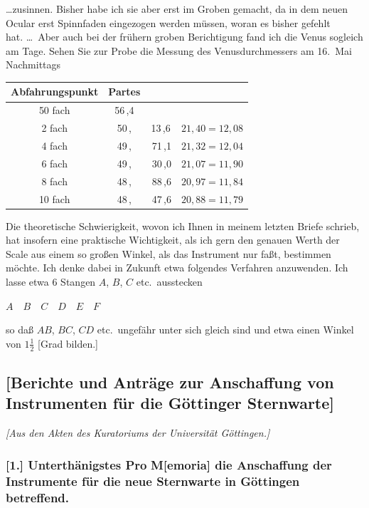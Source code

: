 \documentclass[12pt,a4paper]{article}
\theoremstyle{plain}
\theoremstyle{definition}
\theoremstyle{remark}
\begin{document}
\ldots zusinnen. Bisher habe ich sie aber erst im Groben gemacht, da in dem neuen Ocular erst Spinnfaden eingezogen werden müssen, woran es bisher gefehlt hat.\,\,\ldots\ Aber auch bei der frühern groben Berichtigung fand ich die Venus sogleich am Tage. Sehen Sie zur Probe die Messung des Venusdurchmessers am 16.\ Mai Nachmittags

\begin{center}
\small
\begin{tabular}{c|c|c|c}
Abfahrungspunkt & Partes & & \\
\hline
50 fach & 56\,,4 & & \\
2 fach & 50\,, & 13\,,6 & $21{,}40 = 12{,}08$ \\
4 fach & 49\,, & \,71\,,1 & $21{,}32 = 12{,}04$ \\
6 fach & 49\,, & \,30\,,0 & $21{,}07 = 11{,}90$ \\
8 fach & 48\,, & \,88\,,6 & $20{,}97 = 11{,}84$ \\
10 fach & 48\,, & \,47\,,6 & $20{,}88 = 11{,}79$
\end{tabular}
\end{center}

Die theoretische Schwierigkeit, wovon ich Ihnen in meinem letzten Briefe schrieb, hat insofern eine praktische Wichtigkeit, als ich gern den genauen Werth der Scale aus einem so großen Winkel, als das Instrument nur faßt, bestimmen möchte. Ich denke dabei in Zukunft etwa folgendes Verfahren anzuwenden. Ich lasse etwa 6 Stangen $A$, $B$, $C$ etc.\ ausstecken

\begin{center}
$A\quad B\quad C\quad D\quad E\quad F$
\end{center}

so daß $AB$, $BC$, $CD$ etc.\ ungefähr unter sich gleich sind und etwa einen Winkel von $1\frac{1}{2}$ [Grad bilden.]

\newpage
\subsection*{[Berichte und Anträge zur Anschaffung von Instrumenten für die Göttinger Sternwarte]}

\textit{[Aus den Akten des Kuratoriums der Universität Göttingen.]}

\subsubsection*{[1.] Unterthänigstes Pro\,\,M[emoria] die Anschaffung der Instrumente für die neue Sternwarte in Göttingen betreffend.}
\end{document}
